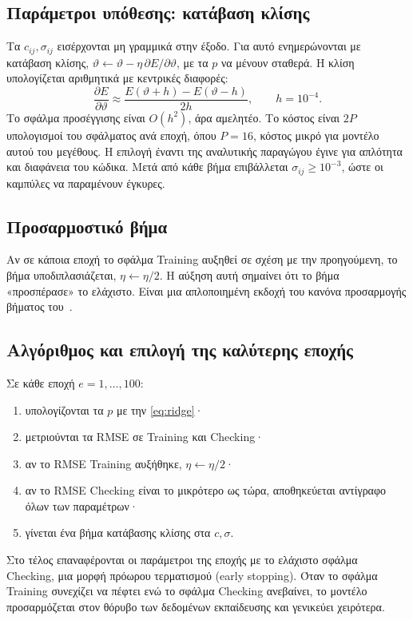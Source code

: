 \documentclass[conference]{IEEEtran}
\begin{document}
\subsection{Παράμετροι υπόθεσης: κατάβαση κλίσης}
Τα $c_{ij},\sigma_{ij}$ εισέρχονται μη γραμμικά στην έξοδο. Για αυτό ενημερώνονται
με κατάβαση κλίσης,
$\vartheta\leftarrow\vartheta-\eta\,\partial E/\partial\vartheta$, με τα
$p$ να μένουν σταθερά. Η κλίση υπολογίζεται αριθμητικά με κεντρικές διαφορές:
\begin{equation}
\frac{\partial E}{\partial\vartheta}\approx
\frac{E(\vartheta+h)-E(\vartheta-h)}{2h},\qquad h=10^{-4}.
\label{eq:numgrad}
\end{equation}
Το σφάλμα προσέγγισης είναι $O(h^2)$, άρα αμελητέο. Το κόστος είναι $2P$
υπολογισμοί του σφάλματος ανά εποχή, όπου $P=16$, κόστος μικρό για μοντέλο αυτού του
μεγέθους. Η επιλογή έναντι της αναλυτικής παραγώγου έγινε για απλότητα και
διαφάνεια του κώδικα. Μετά από κάθε βήμα επιβάλλεται $\sigma_{ij}\ge10^{-3}$,
ώστε οι καμπύλες να παραμένουν έγκυρες.

\subsection{Προσαρμοστικό βήμα}
Αν σε κάποια εποχή το σφάλμα Training αυξηθεί σε σχέση με την προηγούμενη,
το βήμα υποδιπλασιάζεται, $\eta\leftarrow\eta/2$. Η αύξηση αυτή σημαίνει ότι
το βήμα «προσπέρασε» το ελάχιστο. Είναι μια απλοποιημένη εκδοχή του κανόνα
προσαρμογής βήματος του~\cite{jang1993}.

\subsection{Αλγόριθμος και επιλογή της καλύτερης εποχής}
Σε κάθε εποχή $e=1,\ldots,100$:
\begin{enumerate}
\item υπολογίζονται τα $p$ με την \eqref{eq:ridge}·
\item μετριούνται τα RMSE σε Training και Checking·
\item αν το RMSE Training αυξήθηκε, $\eta\leftarrow\eta/2$·
\item αν το RMSE Checking είναι το μικρότερο ως τώρα, αποθηκεύεται αντίγραφο
όλων των παραμέτρων·
\item γίνεται ένα βήμα κατάβασης κλίσης στα $c,\sigma$.
\end{enumerate}
Στο τέλος επαναφέρονται οι παράμετροι της εποχής με το ελάχιστο σφάλμα
Checking, μια μορφή πρόωρου τερματισμού (early stopping). Όταν το σφάλμα Training
συνεχίζει να πέφτει ενώ το σφάλμα Checking ανεβαίνει, το μοντέλο προσαρμόζεται
στον θόρυβο των δεδομένων εκπαίδευσης και γενικεύει χειρότερα.
\end{document}
